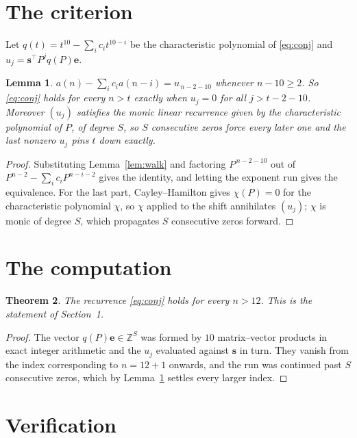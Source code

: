 \documentclass[11pt,a4paper]{article}
\theoremstyle{plain}
\newtheorem{theorem}{Theorem}
\newtheorem{lemma}[theorem]{Lemma}
\theoremstyle{definition}
\begin{document}
\section{The criterion}

Let $q(t)=t^{10}-\sum_i c_i t^{10-i}$ be the characteristic polynomial of
\eqref{eq:conj} and $u_j=\mathbf{s}^{\!\top}P^{j}q(P)\mathbf{e}$.

\begin{lemma}\label{lem:crit}
$a(n)-\sum_i c_i a(n-i)=u_{\,n-2-10}$ whenever $n-10\ge2$. So \eqref{eq:conj}
holds for every $n>t$ exactly when $u_j=0$ for all $j>t-2-10$. Moreover $(u_j)$
satisfies the monic linear recurrence given by the characteristic polynomial of $P$, of
degree $S$, so $S$ consecutive zeros force every later one and the last nonzero $u_j$ pins
$t$ down exactly.
\end{lemma}

\begin{proof}
Substituting Lemma~\ref{lem:walk} and factoring $P^{\,n-2-10}$ out of
$P^{n-2}-\sum_i c_i P^{n-i-2}$ gives the identity, and letting the exponent run gives the
equivalence. For the last part, Cayley--Hamilton gives $\chi(P)=0$ for the characteristic
polynomial $\chi$, so $\chi$ applied to the shift annihilates $(u_j)$; $\chi$ is monic of
degree $S$, which propagates $S$ consecutive zeros forward.
\end{proof}

\section{The computation}

\begin{theorem}
The recurrence \eqref{eq:conj} holds for every $n>12$. This is the statement of
Section~1.
\end{theorem}

\begin{proof}
The vector $q(P)\mathbf{e}\in\mathbb{Z}^{S}$ was formed by $10$ matrix--vector
products in exact integer arithmetic and the $u_j$ evaluated against $\mathbf{s}$ in turn.
They vanish from the index corresponding to $n=12+1$ onwards, and the run was continued
past $S$ consecutive zeros, which by Lemma~\ref{lem:crit} settles every larger index.
\end{proof}

\section{Verification}
\end{document}
